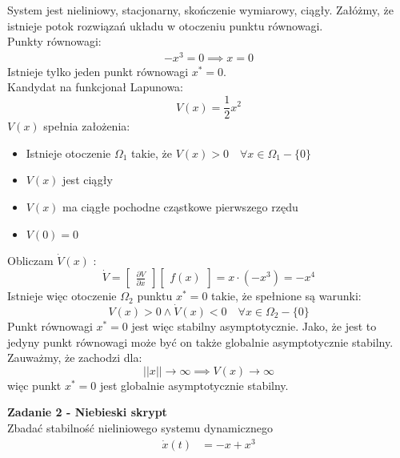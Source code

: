 \documentclass[a4paper,11pt]{article}
\begin{document}
System jest nieliniowy, stacjonarny, skończenie wymiarowy, ciągły. Załóżmy, że istnieje potok rozwiązań układu w otoczeniu punktu równowagi. \\
Punkty równowagi:
\begin{align*}
-x^{3} = 0
\implies
x = 0 
\end{align*}
Istnieje tylko jeden punkt równowagi \( x^{*}=0 \). \\
Kandydat na funkcjonał Lapunowa:
\begin{equation*}
V(x)=\frac{1}{2}x^{2}
\end{equation*}
\(V(x)\) spełnia założenia:
\begin{itemize}
\item Istnieje otoczenie \( \Omega_{1} \) takie, że $ V(x) > 0 \quad \forall x \in \Omega_{1} - \{0\} $
\item $ V(x) $ jest ciągły
\item $ V(x) $ ma ciągłe pochodne cząstkowe pierwszego rzędu
\item $ V(0) = 0 $
\end{itemize}
Obliczam \( \dot{V}(x) \) : \\
\begin{equation*}
\dot{V} = 
\begin{bmatrix}
\frac{\partial V}{\partial x}
\end{bmatrix}
\begin{bmatrix}
f(x)
\end{bmatrix}
=
x \cdot (-x^{3}) =
-x^{4} 
\end{equation*}
Istnieje więc otoczenie \( \Omega_{2} \) punktu \( x^{*} = 0 \) takie, że spełnione są warunki: 
\begin{equation*}
V(x)>0 \land \dot{V}(x) < 0 \quad \forall x \in \Omega_{2} - \{0\}
\end{equation*}
Punkt równowagi \( x^{*}=0 \) jest więc stabilny asymptotycznie. Jako, że jest to jedyny punkt równowagi może być on także globalnie asymptotycznie stabilny. Zauważmy, że zachodzi dla:
\begin{equation*}
||x|| \rightarrow \infty \implies V(x) \rightarrow \infty
\end{equation*} 
więc punkt \( x^{*}=0 \) jest globalnie asymptotycznie stabilny. 

\newpage

\begin{framed}
\textbf{Zadanie 2 - Niebieski skrypt} \\ 
Zbadać stabilność nieliniowego systemu dynamicznego
\begin{align*}
\dot{x}(t)&=-x+x^{3} \\
\end{align*}
\end{framed}
\end{document}
